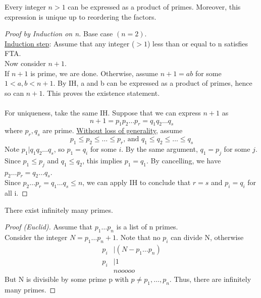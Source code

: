     \begin{theorem} 
        Every integer $n>1$ can be expressed as a product of primes. Moreover, this expression
        is unique up to reordering the factors.
        \begin{proof} [Proof by Induction on n]
            Base case $(n=2)$. \\
            \underline{Induction step}: Assume that any integer ($>1$) less than or equal
            to n satisfies FTA. \\
            Now consider $n+1$. \\
            If $n+1$ is prime, we are done. Otherwise, assume $n+1=ab$ for some $1<a,b<n+1$. 
            By IH, a and b can be expressed as a product of primes, hence so can $n+1$. 
            This proves the existence statement. \\\\
            For uniqueness, take the same IH. 
            Suppose that we can express $n+1$ as
            \[
                n+1=p_1p_2\dots p_r = q_1q_2\dots q_s
            \]
            where $p_r,q_s$ are prime. \underline{Without loss of generality}, assume
            \[
                p_1\leq p_2\leq\dots\leq p_r \text{, and } q_1\leq q_2\leq\dots\leq q_s
            \]
            Note $p_1|q_1q_2\dots q_s$, so $p_1=q_i$ for some $i$.
            By the same argument, $q_1=p_j$ for some $j$. \\
            Since $p_1\leq p_j$ and $q_1\leq q_2$, this implies $p_1=q_1$. 
            By cancelling, we have $p_2\dots p_r = q_2\dots q_s$. \\
            Since $p_2\dots p_r = q_1\dots q_s \leq n$, we can apply IH to conclude that
            $r=s$ and $p_i = q_i$ for all i.
        \end{proof}
    \end{theorem}

    \begin{theorem}
        There exist infinitely many primes.
        \begin{proof} [Proof (Euclid)]
            Assume that $p_1\dots p_n$ is a list of n primes. \\
            Consider the integer $N=p_1\dots p_n+1$.
            Note that no $p_i$ can divide N, otherwise 
            \begin{align*}
                p_i &| (N-p_1\dots p_n) \\
                p_i &| 1 \\
                & nooooo
            \end{align*}
            But N is divisible by some prime p with $p\neq p_1,\dots,p_n$. 
            Thus, there are infinitely many primes.
        \end{proof}
    \end{theorem}

        

